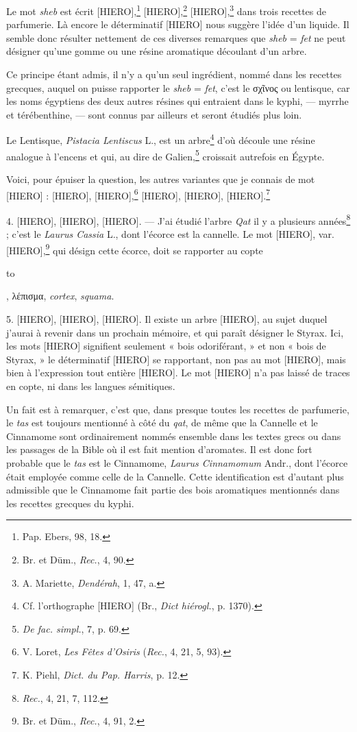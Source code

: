 \documentclass[a4paper, 11pt, oneside, landscape]{article}
\begin{document}
Le mot \emph{sheb} est écrit [HIERO],\footnote{Pap. Ebers, 98, 18.} [HIERO],\footnote{Br. et Düm., \emph{Rec.}, 4, 90.} [HIERO],\footnote{A. Mariette, \emph{Dendérah}, 1, 47, a.} dans trois recettes de parfumerie. Là encore le déterminatif [HIERO] nous suggère l'idée d'un liquide. Il semble donc résulter nettement de ces diverses remarques que \emph{sheb} = \emph{fet} ne peut désigner qu'une gomme ou une résine aromatique découlant d'un arbre.

Ce principe étant admis, il n'y a qu'un seul ingrédient, nommé dans les recettes grecques, auquel on puisse rapporter le \emph{sheb} = \emph{fet}, c'est le σχῖνος ou lentisque, car les noms égyptiens des deux autres résines qui entraient dans le kyphi, --- myrrhe et térébenthine, --- sont connus par ailleurs et seront étudiés plus loin.

Le Lentisque, \emph{Pistacia Lentiscus} L., est un arbre\footnote{Cf. l'orthographe [HIERO] (Br., \emph{Dict hiérogl.}, p. 1370).} d'où découle une résine analogue à l'encens et qui, au dire de Galien,\footnote{\emph{De fac. simpl.}, 7, p. 69.} croissait autrefois en Égypte.

Voici, pour épuiser la question, les autres variantes que je connais de mot [HIERO] : [HIERO], [HIERO],\footnote{V. Loret, \emph{Les Fêtes d'Osiris} (\emph{Rec.}, 4, 21, 5, 93).} [HIERO], [HIERO], [HIERO].\footnote{K. Piehl, \emph{Dict. du Pap. Harris}, p. 12.}

4. [HIERO], [HIERO], [HIERO]. --- J'ai étudié l'arbre \emph{Qat} il y a plusieurs années\footnote{\emph{Rec.}, 4, 21, 7, 112.} ; c'est le \emph{Laurus Cassia} L., dont l'écorce est la cannelle. Le mot [HIERO], var. [HIERO],\footnote{Br. et Düm., \emph{Rec.}, 4, 91, 2.} qui désign cette écorce, doit se rapporter au copte \begin{coptic}to\end{coptic}, λέπισμα, \emph{cortex}, \emph{squama}.

5. [HIERO], [HIERO], [HIERO]. Il existe un arbre [HIERO], au sujet duquel j'aurai à revenir dans un prochain mémoire, et qui paraît désigner le Styrax. Ici, les mots [HIERO] signifient seulement « bois odoriférant, » et non « bois de Styrax, » le déterminatif [HIERO] se rapportant, non pas au mot [HIERO], mais bien à l'expression tout entière [HIERO]. Le mot [HIERO] n'a pas laissé de traces en copte, ni dans les langues sémitiques.

Un fait est à remarquer, c'est que, dans presque toutes les recettes de parfumerie, le \emph{tas} est toujours mentionné à côté du \emph{qat}, de même que la Cannelle et le Cinnamome sont ordinairement nommés ensemble dans les textes grecs ou dans les passages de la Bible où il est fait mention d'aromates. Il est donc fort probable que le \emph{tas} est le Cinnamome, \emph{Laurus Cinnamomum} Andr., dont l'écorce était employée comme celle de la Cannelle. Cette identification est d'autant plus admissible que le Cinnamome fait partie des bois aromatiques mentionnés dans les recettes grecques du kyphi.
\end{document}

